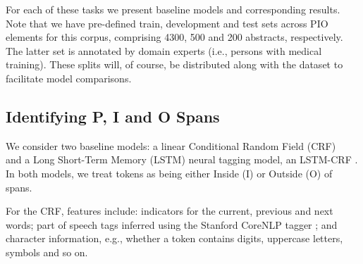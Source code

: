 \documentclass[11pt,a4paper]{article}
\begin{document}




For each of these tasks we present baseline models and corresponding results. Note that we have pre-defined train, development and test sets across PIO elements for this corpus, comprising 4300, 500 and 200 abstracts, respectively. The latter set is annotated by domain experts (i.e., persons with medical training). These splits will, of course, be distributed along with the dataset to facilitate model comparisons.


\subsection{Identifying P, I and O Spans}
\label{section:tasks-spans}

We consider two baseline models: a linear Conditional Random Field (CRF) ~\cite{lafferty2001conditional} and a Long Short-Term Memory (LSTM) neural tagging model, an LSTM-CRF \cite{lample2016neural,ma-hovy:2016:P16-1}. In both models, we treat tokens as being either Inside (I) or Outside (O) of spans.  %

For the CRF, features include: indicators for the current, previous and next words; part of speech tags inferred using the Stanford CoreNLP tagger \cite{DBLP:conf/acl/ManningSBFBM14}; and character information, e.g., whether a token contains digits, uppercase letters, symbols and so on.%
\end{document}
